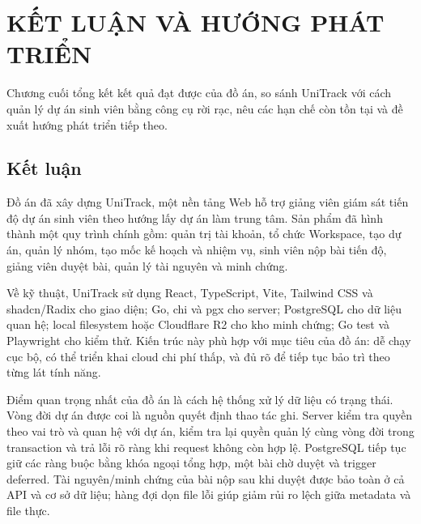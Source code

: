 \chapter{KẾT LUẬN VÀ HƯỚNG PHÁT TRIỂN}

Chương cuối tổng kết kết quả đạt được của đồ án, so sánh UniTrack với cách quản lý dự án sinh viên bằng công cụ rời rạc, nêu các hạn chế còn tồn tại và đề xuất hướng phát triển tiếp theo.

\section{Kết luận}

Đồ án đã xây dựng UniTrack, một nền tảng Web hỗ trợ giảng viên giám sát tiến độ dự án sinh viên theo hướng lấy dự án làm trung tâm. Sản phẩm đã hình thành một quy trình chính gồm: quản trị tài khoản, tổ chức Workspace, tạo dự án, quản lý nhóm, tạo mốc kế hoạch và nhiệm vụ, sinh viên nộp bài tiến độ, giảng viên duyệt bài, quản lý tài nguyên và minh chứng.

Về kỹ thuật, UniTrack sử dụng React, TypeScript, Vite, Tailwind CSS và shadcn/Radix cho giao diện; Go, chi và pgx cho server; PostgreSQL cho dữ liệu quan hệ; local filesystem hoặc Cloudflare R2 cho kho minh chứng; Go test và Playwright cho kiểm thử. Kiến trúc này phù hợp với mục tiêu của đồ án: dễ chạy cục bộ, có thể triển khai cloud chi phí thấp, và đủ rõ để tiếp tục bảo trì theo từng lát tính năng.

Điểm quan trọng nhất của đồ án là cách hệ thống xử lý dữ liệu có trạng thái. Vòng đời dự án được coi là nguồn quyết định thao tác ghi. Server kiểm tra quyền theo vai trò và quan hệ với dự án, kiểm tra lại quyền quản lý cùng vòng đời trong transaction và trả lỗi rõ ràng khi request không còn hợp lệ. PostgreSQL tiếp tục giữ các ràng buộc bằng khóa ngoại tổng hợp, một bài chờ duyệt và trigger deferred. Tài nguyên/minh chứng của bài nộp sau khi duyệt được bảo toàn ở cả API và cơ sở dữ liệu; hàng đợi dọn file lỗi giúp giảm rủi ro lệch giữa metadata và file thực.

